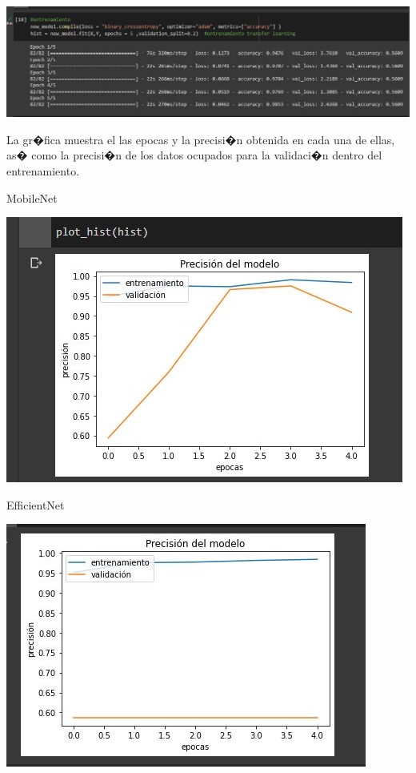 \documentclass[12pt,letterpaper]{article}
\begin{document}
\begin{center}
  \includegraphics[scale=0.4]{imagenes/entrenamientomn.JPG}
 \label{fig:MobileNetEn} 
\end{center} 

La gr�fica muestra el las epocas y la precisi�n obtenida en cada una de ellas, as� como la precisi�n de los datos ocupados para la validaci�n dentro del entrenamiento. 

MobileNet

\begin{center}
  \includegraphics[scale=0.4]{imagenes/ENgrafico.JPG}
 \label{fig:GraficaEN} 
\end{center} 

EfficientNet

\begin{center}
  \includegraphics[scale=0.4]{imagenes/MNgrafico.JPG}
 \label{fig:GraficaMN} 
\end{center} 
\end{document}
